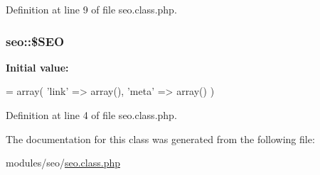 Definition at line 9 of file seo.\-class.\-php.

\hypertarget{classseo_a62e2daf05c8f89d686771b4784e47b3d}{
\subsubsection[{\$\-S\-E\-O}]{\setlength{\rightskip}{0pt plus 5cm}seo\-::\$\-S\-E\-O}}\label{classseo_a62e2daf05c8f89d686771b4784e47b3d}
{\bfseries Initial value\-:}
\begin{DoxyCode}
= array(
        \textcolor{stringliteral}{'link'} => array(),
        \textcolor{stringliteral}{'meta'} => array()
    )
\end{DoxyCode}


Definition at line 4 of file seo.\-class.\-php.



The documentation for this class was generated from the following file\-:\begin{DoxyCompactItemize}
\item 
modules/seo/\hyperlink{seo_8class_8php}{seo.\-class.\-php}\end{DoxyCompactItemize}
